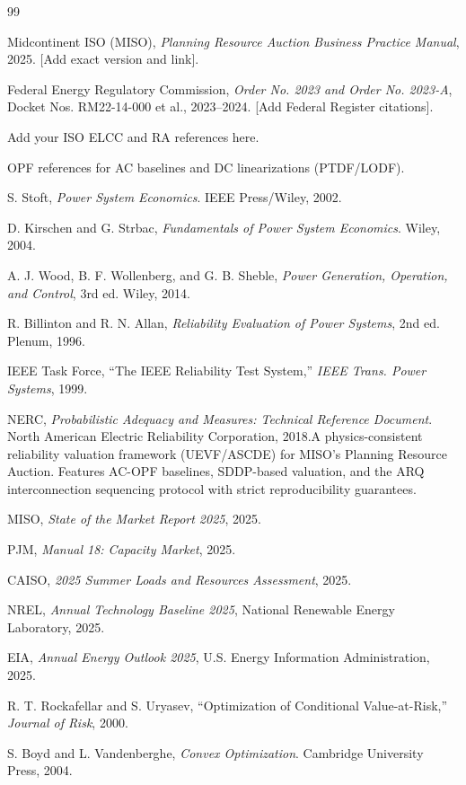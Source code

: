 \documentclass[11pt]{article}
\numberwithin{equation}{section}
\theoremstyle{definition}
\theoremstyle{remark}
\begin{document}

\begin{thebibliography}{99}

Midcontinent ISO (MISO), \emph{Planning Resource Auction Business Practice Manual}, 2025. [Add exact version and link].

Federal Energy Regulatory Commission, \emph{Order No. 2023 and Order No. 2023-A}, Docket Nos. RM22-14-000 et al., 2023--2024. [Add Federal Register citations].

Add your ISO ELCC and RA references here.

OPF references for AC baselines and DC linearizations (PTDF/LODF).

S. Stoft, \textit{Power System Economics}. IEEE Press/Wiley, 2002.

D. Kirschen and G. Strbac, \textit{Fundamentals of Power System Economics}. Wiley, 2004.

A. J. Wood, B. F. Wollenberg, and G. B. Sheble, \textit{Power Generation, Operation, and Control}, 3rd ed. Wiley, 2014.

R. Billinton and R. N. Allan, \textit{Reliability Evaluation of Power Systems}, 2nd ed. Plenum, 1996.

IEEE Task Force, ``The IEEE Reliability Test System,'' \textit{IEEE Trans. Power Systems}, 1999.

NERC, \textit{Probabilistic Adequacy and Measures: Technical Reference Document}. North American Electric Reliability Corporation, 2018.A physics-consistent reliability valuation framework (UEVF/ASCDE) for MISO's Planning Resource Auction. Features AC-OPF baselines, SDDP-based valuation, and the ARQ interconnection sequencing protocol with strict reproducibility guarantees.

MISO, \textit{State of the Market Report 2025}, 2025.

PJM, \textit{Manual 18: Capacity Market}, 2025.

CAISO, \textit{2025 Summer Loads and Resources Assessment}, 2025.

NREL, \textit{Annual Technology Baseline 2025}, National Renewable Energy Laboratory, 2025.

EIA, \textit{Annual Energy Outlook 2025}, U.S. Energy Information Administration, 2025.

R. T. Rockafellar and S. Uryasev, ``Optimization of Conditional Value-at-Risk,'' \textit{Journal of Risk}, 2000.

S. Boyd and L. Vandenberghe, \textit{Convex Optimization}. Cambridge University Press, 2004.

\end{thebibliography}
\end{document}
